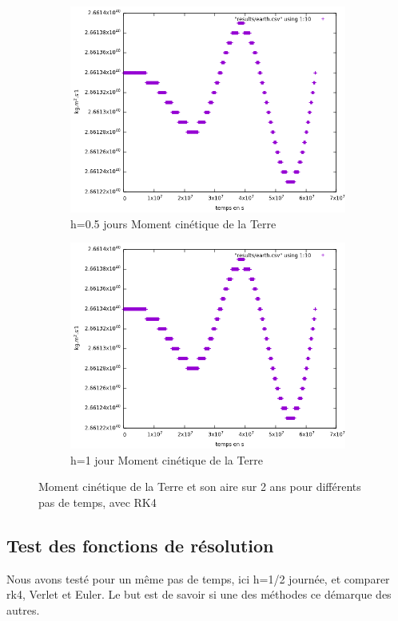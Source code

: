\documentclass[11pt]{article}
\begin{document}
\begin{figure}[H]
\begin{subfigure}{0.5\textwidth}
\includegraphics[width=1\linewidth]{modelisations/h=0.5j/mmc_earth_0.5.png}
\caption{h=0.5 jours Moment cinétique de la Terre}
\label{fig:4subim2}
\end{subfigure}
\begin{subfigure}{0.5\textwidth}
\includegraphics[width=1\linewidth]{modelisations/h=j/mmc_terre_1.png}
\caption{h=1 jour Moment cinétique de la Terre}
\label{fig:4subim3}
\end{subfigure}
\caption{Moment cinétique de la Terre et son aire sur 2 ans pour différents pas de temps, avec RK4}
\label{fig:image2}
\end{figure}
\subsection{Test des fonctions de résolution}
Nous avons testé pour un même pas de temps, ici h=1/2 journée, et comparer rk4, Verlet et Euler. Le but est de savoir si une des méthodes ce démarque des autres.
\end{document}

